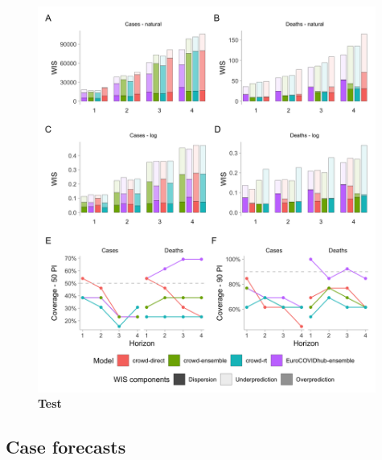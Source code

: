 \documentclass[10pt,a4paper,twocolumn]{article}
\begin{document}
\begin{figure}[H]
\centering
\includegraphics[width=0.99\textwidth]{../output/figures/performance.png}
\caption{\bf{Test}}
\label{fig:performance}
\end{figure}

\subsection*{Case forecasts}
\end{document}
